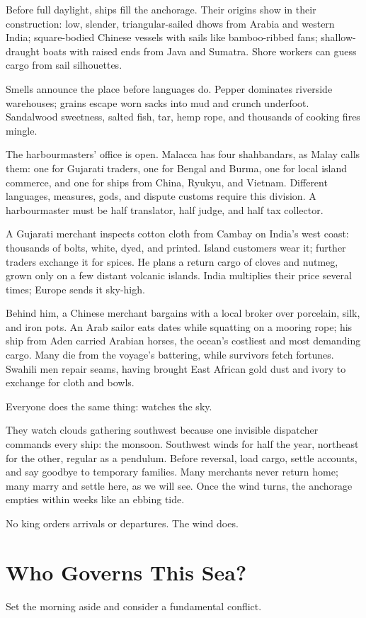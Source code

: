Before full daylight, ships fill the anchorage. Their origins show in their construction: low, slender, triangular-sailed dhows from Arabia and western India; square-bodied Chinese vessels with sails like bamboo-ribbed fans; shallow-draught boats with raised ends from Java and Sumatra. Shore workers can guess cargo from sail silhouettes.

Smells announce the place before languages do. Pepper dominates riverside warehouses; grains escape worn sacks into mud and crunch underfoot. Sandalwood sweetness, salted fish, tar, hemp rope, and thousands of cooking fires mingle.

The harbourmasters' office is open. Malacca has four shahbandars, as Malay calls them: one for Gujarati traders, one for Bengal and Burma, one for local island commerce, and one for ships from China, Ryukyu, and Vietnam. Different languages, measures, gods, and dispute customs require this division. A harbourmaster must be half translator, half judge, and half tax collector.

A Gujarati merchant inspects cotton cloth from Cambay on India's west coast: thousands of bolts, white, dyed, and printed. Island customers wear it; further traders exchange it for spices. He plans a return cargo of cloves and nutmeg, grown only on a few distant volcanic islands. India multiplies their price several times; Europe sends it sky-high.

Behind him, a Chinese merchant bargains with a local broker over porcelain, silk, and iron pots. An Arab sailor eats dates while squatting on a mooring rope; his ship from Aden carried Arabian horses, the ocean's costliest and most demanding cargo. Many die from the voyage's battering, while survivors fetch fortunes. Swahili men repair seams, having brought East African gold dust and ivory to exchange for cloth and bowls.

Everyone does the same thing: watches the sky.

They watch clouds gathering southwest because one invisible dispatcher commands every ship: the monsoon. Southwest winds for half the year, northeast for the other, regular as a pendulum. Before reversal, load cargo, settle accounts, and say goodbye to temporary families. Many merchants never return home; many marry and settle here, as we will see. Once the wind turns, the anchorage empties within weeks like an ebbing tide.

No king orders arrivals or departures. The wind does.

\section{Who Governs This Sea?}
Set the morning aside and consider a fundamental conflict.

